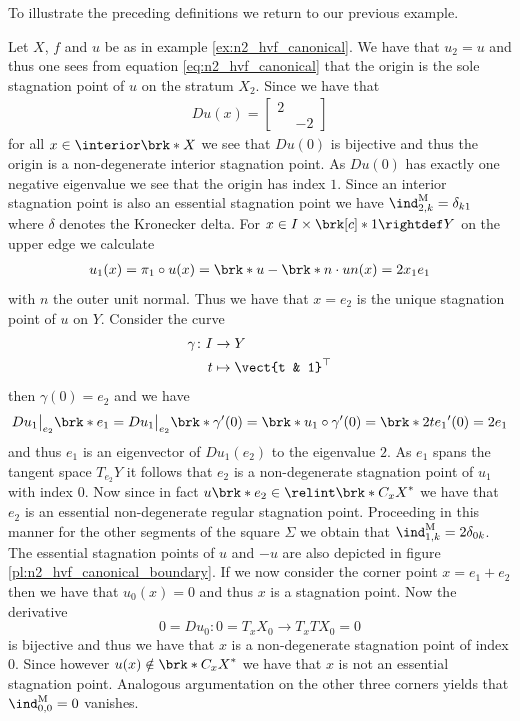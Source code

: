 To illustrate the preceding definitions we return to our previous example.
\begin{example}\label{ex:n2_hvf_index}
  Let $X$, $f$ and $u$ be as in example \ref{ex:n2_hvf_canonical}.
  We have that $u_2=u$ and thus
  one sees from equation \eqref{eq:n2_hvf_canonical}
  that the origin is the sole stagnation point of $u$ on the stratum $X_2$. Since we have that
  \begin{align*}
    Du(x) = \begin{bmatrix}
      2 & \\
       & -2
    \end{bmatrix}
  \end{align*}
  for all $x\in\openX$ we see that $Du(0)$ is bijective and thus the origin is a non-degenerate interior stagnation point.
  As $Du(0)$ has
  exactly one negative eigenvalue we see that the origin has index $1$. 
  Since an interior stagnation point is also an essential stagnation point 
  we have $\ind^\text{M}_{2,k}=\delta_{k1}$ where $\delta$ denotes the Kronecker delta.
  For $x\in I\times\brk[c]*{1}\rightdef Y$ on the upper edge we calculate
  \begin{align*}
    u_1(x)=\pi_1\circ u(x)=\brk*{u-\brk*{n\cdot u}n}(x)
    =2x_1e_1
  \end{align*}
  with $n$ the outer unit normal.
  Thus we have that $x=e_2$ is the unique stagnation point of $u$ on $Y$.
  Consider the curve
  \begin{align*}
    \gamma\colon I&\to Y\\
    t&\mapsto \vect{t & 1}^\top
  \end{align*}
  then $\gamma(0)=e_2$ and we have
  \begin{align*}
    Du_1\big\vert_{e_2}\brk*{e_1}
    =Du_1\big\vert_{e_2}\brk*{\gamma'(0)}
    =\brk*{u_1\circ \gamma}'(0)
    =\brk*{2te_1}'(0)=2e_1
  \end{align*}
  and thus $e_1$ is an eigenvector of $Du_1(e_2)$ to the eigenvalue $2$. As $e_1$
  spans the tangent space $T_{e_2}Y$ it follows that $e_2$ is a non-degenerate stagnation point
  of $u_1$ with index $0$.
  Now since in fact $u\brk*{e_2}\in\relint\brk*{C_xX}^*$ we have that $e_2$ is an essential non-degenerate regular 
  stagnation point.
  Proceeding in this manner for the other segments of the square $\Sigma$ we obtain that
  $\ind^\text{M}_{1,k}=2\delta_{0k}$.
  The essential stagnation points of $u$ and $-u$ are also depicted in figure \ref{pl:n2_hvf_canonical_boundary}.
  If we now consider the corner point $x=e_1+e_2$ then we have that $u_0(x)=0$ and thus $x$ is a stagnation
  point.
  Now the derivative
  $$0=Du_0\colon 0=T_xX_0\to T_xTX_0=0$$
  is bijective and thus
  we have that $x$ is a non-degenerate stagnation point of
  index $0$. Since however $u(x)\notin \brk*{C_xX}^*$ we have that $x$ is not an essential stagnation point.
  Analogous argumentation on the other three corners yields that $\ind^\text{M}_{0,0}=0$ vanishes.
\end{example}

